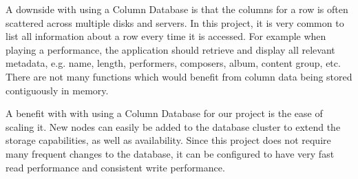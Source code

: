 A downside with using a Column Database is that the columns for a row is often scattered across multiple disks and servers. In this project, it is very common to list all information about a row every time it is accessed. For example when playing a performance, the application should retrieve and display all relevant metadata, e.g. name, length, performers, composers, album, content group, etc. There are not many functions which would benefit from column data being stored contiguously in memory.

A benefit with with using a Column Database for our project is the ease of scaling it. New nodes can easily be added to the database cluster to extend the storage capabilities, as well as availability. Since this project does not require many frequent changes to the database, it can be configured to have very fast read performance and consistent write performance.
